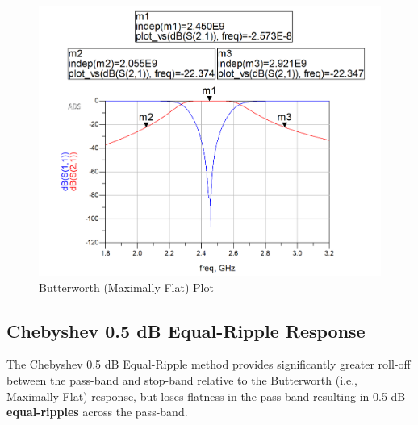 \documentclass{article}
\begin{document}
\newpage
\begin{figure}[h!]
    \centering
    \includegraphics[scale=0.5]{images/butterworth_plot.png}
    \caption{Butterworth (Maximally Flat) Plot}
    \label{fig:3}
\end{figure}

\subsection{Chebyshev 0.5 dB Equal-Ripple Response}
The Chebyshev 0.5 dB Equal-Ripple method provides significantly greater roll-off between the pass-band and stop-band relative to the Butterworth (i.e., Maximally Flat) response, but loses flatness in the pass-band resulting in 0.5 dB \textbf{equal-ripples} across the pass-band.
\end{document}
